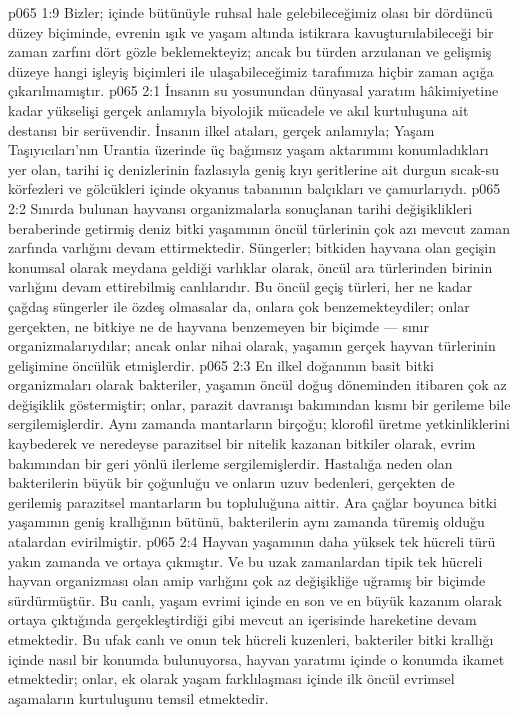 \vs p065 1:9 Bizler; içinde bütünüyle ruhsal hale gelebileceğimiz olası bir dördüncü düzey biçiminde, evrenin ışık ve yaşam altında istikrara kavuşturulabileceği bir zaman zarfını dört gözle beklemekteyiz; ancak bu türden arzulanan ve gelişmiş düzeye hangi işleyiş biçimleri ile ulaşabileceğimiz tarafımıza hiçbir zaman açığa çıkarılmamıştır.
\vs p065 2:1 İnsanın su yosunundan dünyasal yaratım hâkimiyetine kadar yükselişi gerçek anlamıyla biyolojik mücadele ve akıl kurtuluşuna ait destansı bir serüvendir. İnsanın ilkel ataları, gerçek anlamıyla; Yaşam Taşıyıcıları’nın Urantia üzerinde üç bağımsız yaşam aktarımını konumladıkları yer olan, tarihi iç denizlerinin fazlasıyla geniş kıyı şeritlerine ait durgun sıcak\hyp{}su körfezleri ve gölcükleri içinde okyanus tabanının balçıkları ve çamurlarıydı.
\vs p065 2:2 Sınırda bulunan hayvansı organizmalarla sonuçlanan tarihi değişiklikleri beraberinde getirmiş deniz bitki yaşamının öncül türlerinin çok azı mevcut zaman zarfında varlığını devam ettirmektedir. Süngerler; bitkiden hayvana olan  geçişin konumsal olarak meydana geldiği varlıklar olarak, öncül ara türlerinden birinin varlığını devam ettirebilmiş canlılarıdır. Bu öncül geçiş türleri, her ne kadar çağdaş süngerler ile özdeş olmasalar da, onlara çok benzemekteydiler; onlar gerçekten, ne bitkiye ne de hayvana benzemeyen bir biçimde --- sınır organizmalarıydılar; ancak onlar nihai olarak, yaşamın gerçek hayvan türlerinin gelişimine öncülük etmişlerdir.
\vs p065 2:3 En ilkel doğanının basit bitki organizmaları olarak bakteriler, yaşamın öncül doğuş döneminden itibaren çok az değişiklik göstermiştir; onlar, parazit davranışı bakımından kısmı bir gerileme bile sergilemişlerdir. Aynı zamanda mantarların birçoğu; klorofil üretme yetkinliklerini kaybederek ve neredeyse parazitsel bir nitelik kazanan bitkiler olarak, evrim bakımından bir geri yönlü ilerleme sergilemişlerdir. Hastalığa neden olan bakterilerin büyük bir çoğunluğu ve onların uzuv bedenleri, gerçekten de gerilemiş parazitsel mantarların bu topluluğuna aittir. Ara çağlar boyunca bitki yaşamının geniş krallığının bütünü, bakterilerin aynı zamanda türemiş olduğu atalardan evirilmiştir.
\vs p065 2:4 Hayvan yaşamının daha yüksek tek hücreli türü yakın zamanda ve  ortaya çıkmıştır. Ve bu uzak zamanlardan tipik tek hücreli hayvan organizması olan amip varlığını çok az değişikliğe uğramış bir biçimde sürdürmüştür. Bu canlı, yaşam evrimi içinde en son ve en büyük kazanım olarak ortaya çıktığında gerçekleştirdiği gibi mevcut an içerisinde hareketine devam etmektedir. Bu ufak canlı ve onun tek hücreli kuzenleri, bakteriler bitki krallığı içinde nasıl bir konumda bulunuyorsa, hayvan yaratımı içinde o konumda ikamet etmektedir; onlar,  ek olarak yaşam farklılaşması içinde ilk öncül evrimsel aşamaların kurtuluşunu temsil etmektedir.
